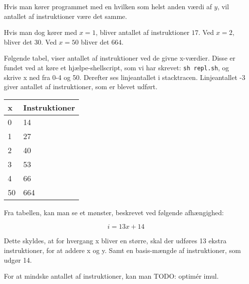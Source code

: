 \documentclass[12pt,a4paper]{article}
\begin{document}
Hvis man kører programmet med en hvilken som helst anden værdi af $y$, vil antallet af instruktioner være det samme.

Hvis man dog kører med $x=1$, bliver antallet af instruktioner $17$. Ved $x=2$, bliver det $30$. Ved $x=50$ bliver det $664$.

Følgende tabel, viser antallet af instruktioner ved de givne x-værdier. Disse er fundet ved at køre et hjælpe-shellscript, som vi har skrevet: \texttt{sh repl.sh}, og skrive x ned fra 0-4 og 50. Derefter ses linjeantallet i stacktracen. Linjeantallet -3 giver antallet af instruktioner, som er blevet udført.

\begin{tabular}{|l|l|}
\hline
x  & Instruktioner \\ \hline
0  & 14  \\ \hline
1  & 27  \\ \hline
2  & 40  \\ \hline
3  & 53  \\ \hline
4  & 66  \\ \hline
50 & 664 \\ \hline

\end{tabular}

Fra tabellen, kan man se et mønster, beskrevet ved følgende afhængighed:

\[
	i = 13x + 14
\]

Dette skyldes, at for hvergang x bliver en større, skal der udføres 13 ekstra instruktioner, for at addere x og y. Samt en basis-mængde af instruktioner, som udgør 14.

For at mindske antallet af instruktioner, kan man TODO: optimér imul.
\end{document}
